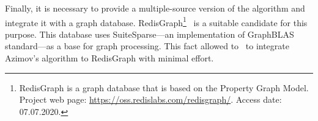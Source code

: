 Finally, it is necessary to provide a multiple-source version of the algorithm and integrate it with a graph database.
RedisGraph\footnote{RedisGraph is a graph database that is based on the Property Graph
Model. Project web page: \url{https://oss.redislabs.com/redisgraph/}. Access date:
07.07.2020.}~\citep{8778293} is a suitable candidate for this purpose.
This database uses SuiteSparse---an implementation of GraphBLAS standard---as a base for graph processing.
This fact allowed to~\cite{10.1145/3398682.3399163} to integrate Azimov's algorithm to RedisGraph with minimal effort.
